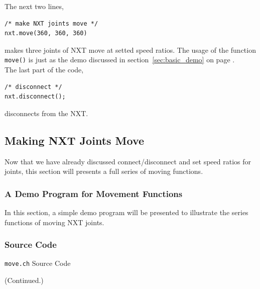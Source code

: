 \documentclass[11pt]{article}
\begin{document}
The next two lines,

\begin{verbatim}
/* make NXT joints move */
nxt.move(360, 360, 360)
\end{verbatim}

makes three joints of NXT move at setted speed ratios. The usage of the function \texttt{move()} is just 
as the demo discussed in section~\ref{sec:basic_demo} on page \pageref{sec:basic_demo}.\\

The last part of the code,

\begin{verbatim}
/* disconnect */
nxt.disconnect();
\end{verbatim}
disconnects from the NXT.\\

\subsection{\label{sec:move_demo}Making NXT Joints Move}
Now that we have already discussed connect/disconnect and set speed ratios for joints, this section will presents a full
series of moving functions.

\subsubsection{A Demo Program for Movement Functions}
In this section, a simple demo program will be presented to illustrate the series functions of moving NXT joints.

\subsubsection*{Source Code}

\begin{Program}[H]
    {\small}
    \caption{\texttt{move.ch} Source Code\label{prog_move.ch}}
\end{Program}
\addtocounter{Program}{-1}
\begin{Program}[H]
    {\small}
    \caption{(Continued.)\label{prog_move.ch}}
\end{Program}
\end{document}
